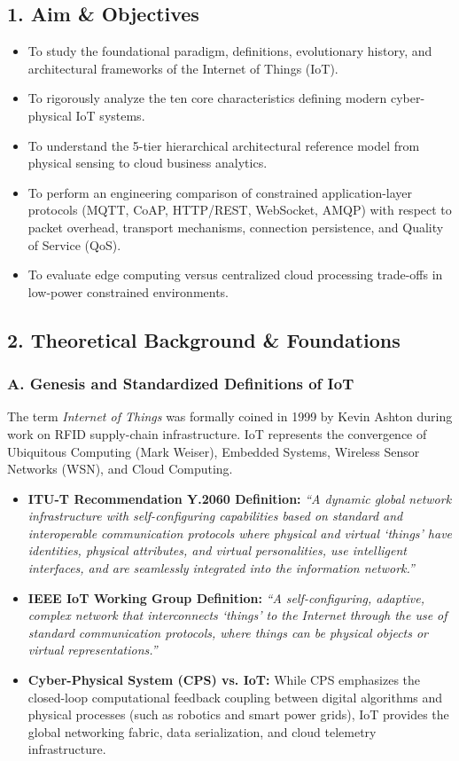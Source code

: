 \documentclass[11pt,a4paper]{article}
\begin{document}
\subsection*{1. Aim \& Objectives}
\begin{itemize}[noitemsep]
    \item To study the foundational paradigm, definitions, evolutionary history, and architectural frameworks of the Internet of Things (IoT).
    \item To rigorously analyze the ten core characteristics defining modern cyber-physical IoT systems.
    \item To understand the 5-tier hierarchical architectural reference model from physical sensing to cloud business analytics.
    \item To perform an engineering comparison of constrained application-layer protocols (MQTT, CoAP, HTTP/REST, WebSocket, AMQP) with respect to packet overhead, transport mechanisms, connection persistence, and Quality of Service (QoS).
    \item To evaluate edge computing versus centralized cloud processing trade-offs in low-power constrained environments.
\end{itemize}

\subsection*{2. Theoretical Background \& Foundations}

\subsubsection*{A. Genesis and Standardized Definitions of IoT}
The term \textit{Internet of Things} was formally coined in 1999 by Kevin Ashton during work on RFID supply-chain infrastructure. IoT represents the convergence of Ubiquitous Computing (Mark Weiser), Embedded Systems, Wireless Sensor Networks (WSN), and Cloud Computing.
\begin{itemize}[leftmargin=*]
    \item \textbf{ITU-T Recommendation Y.2060 Definition:} \textit{``A dynamic global network infrastructure with self-configuring capabilities based on standard and interoperable communication protocols where physical and virtual `things' have identities, physical attributes, and virtual personalities, use intelligent interfaces, and are seamlessly integrated into the information network.''}
    \item \textbf{IEEE IoT Working Group Definition:} \textit{``A self-configuring, adaptive, complex network that interconnects `things' to the Internet through the use of standard communication protocols, where things can be physical objects or virtual representations.''}
    \item \textbf{Cyber-Physical System (CPS) vs. IoT:} While CPS emphasizes the closed-loop computational feedback coupling between digital algorithms and physical processes (such as robotics and smart power grids), IoT provides the global networking fabric, data serialization, and cloud telemetry infrastructure.
\end{itemize}
\end{document}
